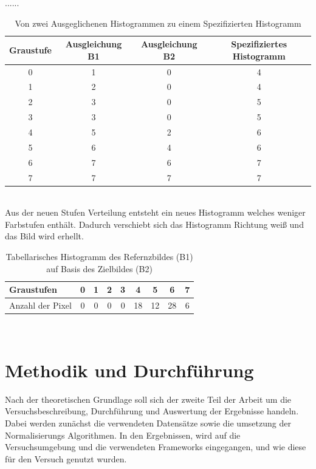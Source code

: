 \documentclass[a4paper,12pt,oneside]{article}
\begin{document}
......\\
\begin{table}
[h]
\caption{Von zwei Ausgeglichenen Histogrammen zu einem Spezifizierten Histogramm}
\centering
\begin{tabular}{|c|c|c|c|}
\hline
Graustufe & Ausgleichung B1 & Ausgleichung B2 & Spezifiziertes Histogramm\\
\hline
0 & 1 & 0 & 4\\
\hline
1 & 2 & 0 & 4\\
\hline
2 & 3 & 0 & 5\\
\hline
3 & 3 & 0 & 5\\
\hline
4 & 5 & 2 & 6\\
\hline
5 & 6 & 4 & 6\\
\hline
6 & 7 & 6 & 7\\
\hline
7 & 7 & 7 & 7\\
\hline
\end{tabular}
\end{table}\\
Aus der neuen Stufen Verteilung entsteht ein neues Histogramm welches weniger Farbstufen enthält. Dadurch verschiebt sich das Histogramm Richtung weiß und das Bild wird erhellt.
\begin{table}
[h]
\caption{Tabellarisches Histogramm des Refernzbildes (B1) auf Basis des Zielbildes (B2)}
\centering
\begin{tabular}{|l|c|c|c|c|c|c|c|c|}
\hline
Graustufen & 0 & 1 & 2 & 3 & 4 & 5 & 6 & 7\\
\hline
Anzahl der Pixel & 0 & 0 & 0 & 0 & 18 & 12 & 28 & 6\\
\hline
\end{tabular}
\end{table}\\
\newpage
  \section{Methodik und Durchführung}\label{s.methudurchf}
Nach der theoretischen Grundlage soll sich der zweite Teil der Arbeit um die Versuchsbeschreibung, Durchführung und Auswertung der Ergebnisse handeln. Dabei werden zunächst die verwendeten Datensätze sowie die umsetzung der Normalisierungs Algorithmen. In den Ergebnissen, wird auf die Versuchsumgebung und die verwendeten Frameworks eingegangen, und wie diese für den Versuch genutzt wurden.
\end{document}
